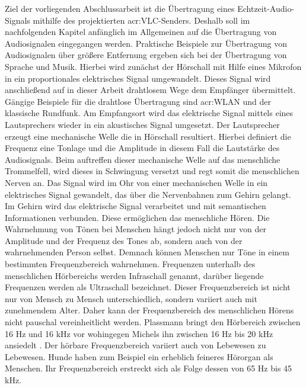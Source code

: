 Ziel der vorliegenden Abschlussarbeit ist die Übertragung eines Echtzeit-Audio-Signals mithilfe des projektierten \gls{acr:VLC}-Senders. Deshalb soll im nachfolgenden Kapitel anfänglich im Allgemeinen auf die Übertragung von Audiosignalen eingegangen werden. Praktische Beispiele zur Übertragung von Audiosignalen über größere Entfernung ergeben sich bei der Übertragung von Sprache und Musik. Hierbei wird zunächst der Hörschall mit Hilfe eines Mikrofon in ein proportionales elektrisches Signal umgewandelt. Dieses Signal wird anschließend auf in dieser Arbeit drahtlosem  Wege dem Empfänger übermittelt. Gängige Beispiele für die drahtlose Übertragung sind \gls{acr:WLAN} und der klassische Rundfunk. Am Empfangsort wird das elektrische Signal mittels eines Lautsprechers wieder in ein akustisches Signal umgesetzt.\cite{plassmannHandbuchElektrotechnik2016} Der Lautsprecher erzeugt eine mechanische Welle die in Hörschall resultiert. Hierbei definiert die Frequenz eine Tonlage und die Amplitude in diesem Fall die Lautstärke des Audiosignals. Beim auftreffen dieser mechanische Welle auf das menschliche Trommelfell, wird dieses in Schwingung versetzt und regt somit die menschlichen Nerven an. Das Signal wird im Ohr von einer mechanischen Welle in ein elektrisches Signal gewandelt, das über die Nervenbahnen zum Gehirn gelangt. Im Gehirn wird das elektrische Signal verarbeitet und mit semantischen Informationen verbunden. Diese ermöglichen das menschliche Hören.\cite{stotzComputergestuetzteAudioUnd2019} Die Wahrnehmung von Tönen bei Menschen hängt jedoch nicht nur von der Amplitude und der Frequenz des Tones ab, sondern auch von der wahrnehmenden Person selbst. Demnach können Menschen nur Töne in einem bestimmten Frequenzbereich wahrnehmen. Frequenzen unterhalb des menschlichen Hörbereichs werden Infraschall genannt, darüber liegende Frequenzen werden als Ultraschall bezeichnet. Dieser Frequenzbereich ist nicht nur von Mensch zu Mensch unterschiedlich, sondern variiert auch mit zunehmendem Alter. Daher kann der Frequenzbereich des menschlichen Hörens nicht pauschal vereinheitlicht werden. Plassmann bringt den Hörbereich zwischen 16 Hz und 16 kHz vor \cite{plassmannHandbuchElektrotechnik2016} wohingegen Michels ihn zwischen 16 Hz bis 20 kHz ansiedelt \cite{michelsSonographieOrganUnd2012}. Der hörbare Frequenzbereich variiert auch von Lebewesen zu Lebewesen. Hunde haben zum Beispiel ein erheblich feineres Hörorgan als Menschen. Ihr Frequenzbereich erstreckt sich als Folge dessen von 65 Hz bis 45 kHz.\cite{michelsSonographieOrganUnd2012}

